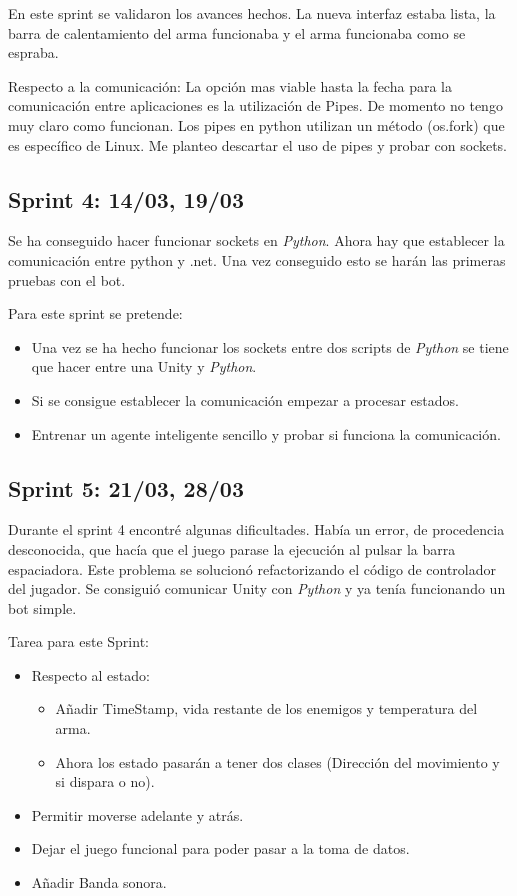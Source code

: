 En este sprint se validaron los avances hechos. La nueva interfaz estaba lista, la barra de calentamiento del arma funcionaba y el arma funcionaba como se espraba.

Respecto a la comunicación:
La opción mas viable hasta la fecha para la comunicación entre aplicaciones es la utilización de Pipes. De momento no tengo muy claro como funcionan. Los pipes en python utilizan un método (os.fork) que es específico de Linux. Me planteo descartar el uso de pipes y probar con sockets.


\subsection{Sprint 4:  14/03, 19/03}

Se ha conseguido hacer funcionar sockets en \emph{Python}. Ahora hay que establecer la comunicación entre python y .net. Una vez conseguido esto se harán las primeras pruebas con el bot.

Para este sprint se pretende:
\begin{itemize}
    \item Una vez se ha hecho funcionar los sockets entre dos scripts de \emph{Python} se tiene que hacer entre una Unity y \emph{Python}.
    \item Si se consigue establecer la comunicación empezar a procesar estados.
    \item Entrenar un agente inteligente sencillo y probar si funciona la comunicación.
\end{itemize}



\subsection{Sprint 5:  21/03, 28/03}

Durante el sprint 4 encontré algunas dificultades. Había un error, de procedencia desconocida, que hacía que el juego parase la ejecución al pulsar la barra espaciadora. Este problema se solucionó refactorizando el código de controlador del jugador. Se consiguió comunicar Unity con \emph{Python} y ya tenía funcionando un bot simple.

Tarea para este Sprint: 
\begin{itemize}
    \item Respecto al estado:
    \begin{itemize}
        \item Añadir TimeStamp, vida restante de los enemigos y temperatura del arma.
        \item Ahora los estado pasarán a tener dos clases (Dirección del movimiento y si dispara o no).
    \end{itemize}
    \item Permitir moverse adelante y atrás.
    \item Dejar el juego funcional para poder pasar a la toma de datos.
    \item Añadir Banda sonora.
\end{itemize}


